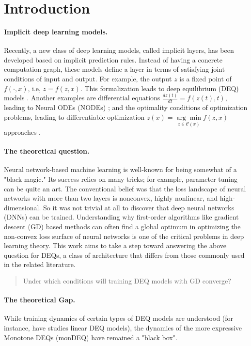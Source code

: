 \documentclass[twoside]{article}
\begin{document}
\section{Introduction}

\paragraph{Implicit deep learning models.} Recently, a new class of deep learning models, called implicit layers, has been developed based on implicit prediction rules. Instead of having a concrete computation graph, these models define a layer in terms of satisfying joint conditions of input and output. For example, the output $z$ is a fixed point of $f(\cdot, x)$, i.e, $z = f(z,x)$. This formalization leads to deep equilibrium (DEQ) models \citep{DEQ}.  Another examples are differential equations $\frac{d z(t)}{dt} = f(z(t), t)$, leading to Neural ODEs (NODEs) \citep{NEURIPS2018_69386f6b}; and the optimality conditions of optimization problems, leading to differentiable optimization $z(x) = \underset{z \in \mathcal{C}(x)}{\arg\min} f(z, x)$ approaches \citep{OptNet}.

\paragraph{The theoretical question.}
Neural network-based machine learning is well-known for being somewhat of a "black magic." 
Its success relies on many tricks; for example, parameter tuning can be quite an art.
The conventional belief was that the loss landscape of neural networks with more than two layers is nonconvex, highly nonlinear, and high-dimensional.
So it was not trivial at all to discover that deep neural networks (DNNs) can be trained.
Understanding why first-order algorithms like gradient descent (GD) based methods can often find a global optimum in optimizing the non-convex loss surface of neural networks is one of the critical problems in deep learning theory.
This work aims to take a step toward answering the above question for DEQs, a class of architecture that differs from those commonly used in the related literature.

\begin{quote}
    Under which conditions will training DEQ models with GD converge?
\end{quote}

\paragraph{The theoretical Gap.}
While training dynamics of certain types of DEQ models are understood (for instance, \citet{kenji} have studies linear DEQ models), the dynamics of the more expressive Monotone DEQs (monDEQ) \citep{monotonedeq} have remained a "black box".
\end{document}
